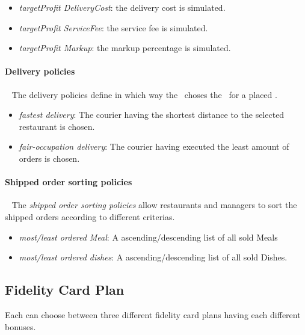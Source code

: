 \begin{itemize}
    \item \emph{targetProfit DeliveryCost}: the delivery cost is simulated.
    \item \emph{targetProfit ServiceFee}: the service fee is simulated.
    \item \emph{targetProfit Markup}: the markup percentage is simulated.
\end{itemize}

\paragraph{Delivery policies}~\vspace{0.3\baselineskip}
The delivery policies define in which way the \Core~choses the \Courier~for a placed \Order.

\begin{itemize}
    \item \emph{fastest delivery}: The courier having the shortest distance to the selected restaurant is chosen.
    \item \emph{fair-occupation delivery}: The courier having executed the least amount of orders is chosen.
\end{itemize}

\paragraph{Shipped order sorting policies}~\vspace{0.3\baselineskip}
The \emph{shipped order sorting policies} allow restaurants and managers
to sort the shipped orders according to different criterias.

\begin{itemize}
    \item \emph{most/least ordered Meal}: A ascending/descending list of all sold Meals
    \item \emph{most/least ordered dishes}: A ascending/descending list of all sold Dishes.
\end{itemize}


\subsection{Fidelity Card Plan} %
\label{sub:fid_card_plan}

Each \Customer can choose between three different fidelity card plans having each different bonuses.

